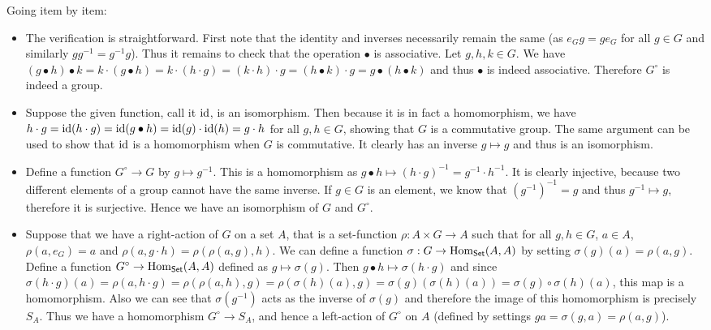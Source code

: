 \begin{solution}
	Going item by item:
	\begin{itemize}
		\item The verification is straightforward. First note that the identity and inverses necessarily remain the same (as $e_G g = g e_G$ for all $g \in G$ and similarly $gg^{-1} = g^{-1}g$). Thus it remains to check that the operation $\bullet$ is associative. Let $g, h, k \in G$. We have $(g \bullet h) \bullet k = k \cdot (g \bullet h) = k \cdot (h \cdot g) = (k \cdot h) \cdot g = (h \bullet k) \cdot g = g \bullet (h \bullet k)$ and thus $\bullet$ is indeed associative. Therefore $G^{\circ}$ is indeed a group.
		
		\item Suppose the given function, call it $\mathrm{id}$, is an isomorphism. Then because it is in fact a homomorphism, we have $h \cdot g = \mathrm{id}(h \cdot g) = \mathrm{id}(g \bullet h) = \mathrm{id}(g) \cdot \mathrm{id}(h) = g \cdot h$ for all $g, h \in G$, showing that $G$ is a commutative group. The same argument can be used to show that $\mathrm{id}$ is a homomorphism when $G$ is commutative. It clearly has an inverse $g \mapsto g$ and thus is an isomorphism.
		
		\item Define a function $G^{\circ} \to G$ by $g \mapsto g^{-1}$. This is a homomorphism as $g \bullet h \mapsto (h \cdot g)^{-1} = g^{-1} \cdot h^{-1}$. It is clearly injective, because two different elements of a group cannot have the same inverse. If $g \in G$ is an element, we know that $(g^{-1})^{-1} = g$ and thus $g^{-1} \mapsto g$, therefore it is surjective. Hence we have an isomorphism of $G$ and $G^{\circ}$.
		
		\item Suppose that we have a right-action of $G$ on a set $A$, that is a set-function $\rho: A \times G \to A$ such that for all $g, h \in G$, $a \in A$, $\rho(a, e_G) = a$ and $\rho(a, g \cdot h) = \rho(\rho(a, g), h)$. We can define a function $\sigma: G \to \mathrm{Hom}_{\mathsf{Set}}(A, A)$ by setting $\sigma(g)(a) = \rho(a, g)$. Define a function $G^{\circ} \to \mathrm{Hom}_{\mathsf{Set}}(A, A)$ defined as $g \mapsto \sigma(g)$. Then $g \bullet h \mapsto \sigma(h \cdot g)$ and since $\sigma(h \cdot g)(a) = \rho(a, h \cdot g) = \rho(\rho(a, h), g) = \rho(\sigma(h)(a), g) = \sigma(g)(\sigma(h)(a)) = \sigma(g) \circ \sigma(h)(a)$, this map is a homomorphism. Also we can see that $\sigma(g^{-1})$ acts as the inverse of $\sigma(g)$ and therefore the image of this homomorphism is precisely $S_A$. Thus we have a homomorphism $G^{\circ} \to S_A$, and hence a left-action of $G^{\circ}$ on $A$ (defined by settings $ga = \sigma(g, a) = \rho(a, g)$).
		

\end{itemize}
\end{solution}

